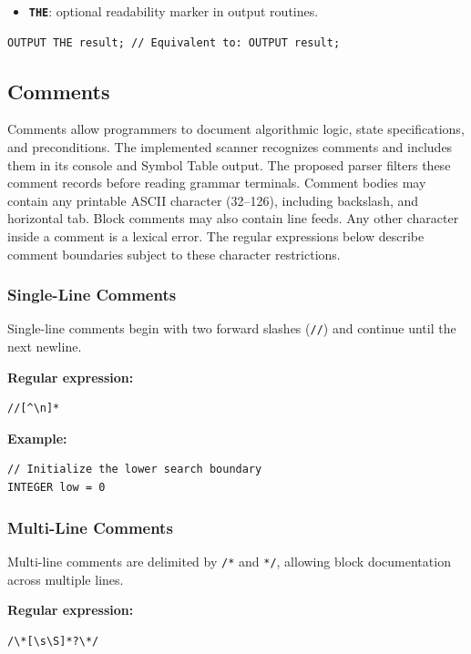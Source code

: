 \documentclass[11pt,a4paper]{article}
\newcommand{\kw}[1]{\texttt{\bfseries\color{pupmaroon}#1}}
\newcommand{\codeinline}[1]{\texttt{#1}}
\begin{document}
\begin{itemize}
  \item \kw{THE}: optional readability marker in output routines.
\end{itemize}
\begin{lstlisting}
OUTPUT THE result; // Equivalent to: OUTPUT result;
\end{lstlisting}

\subsection{Comments}\label{sec:comments}

Comments allow programmers to document algorithmic logic, state specifications, and preconditions. The implemented scanner recognizes comments and includes them in its console and Symbol Table output. The proposed parser filters these comment records before reading grammar terminals. Comment bodies may contain any printable ASCII character (32--126), including backslash, and horizontal tab. Block comments may also contain line feeds. Any other character inside a comment is a lexical error. The regular expressions below describe comment boundaries subject to these character restrictions.

\subsubsection{Single-Line Comments}

Single-line comments begin with two forward slashes (\codeinline{//}) and continue until the next newline.

\textbf{Regular expression:}
\begin{lstlisting}[language={}]
//[^\n]*
\end{lstlisting}

\textbf{Example:}
\begin{lstlisting}
// Initialize the lower search boundary
INTEGER low = 0
\end{lstlisting}

\subsubsection{Multi-Line Comments}

Multi-line comments are delimited by \codeinline{/*} and \codeinline{*/}, allowing block documentation across multiple lines.

\textbf{Regular expression:}
\begin{lstlisting}[language={}]
/\*[\s\S]*?\*/
\end{lstlisting}
\end{document}
